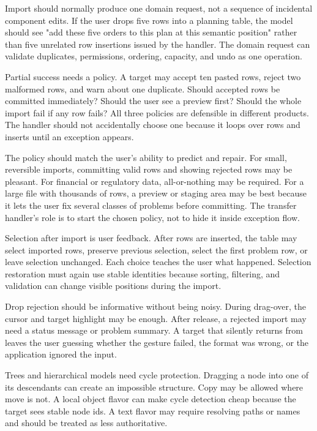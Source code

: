 Import should normally produce one domain request, not a sequence of incidental component edits. If the user drops five rows into a planning table, the model should see "add these five orders to this plan at this semantic position" rather than five unrelated row insertions issued by the handler. The domain request can validate duplicates, permissions, ordering, capacity, and undo as one operation.

Partial success needs a policy. A target may accept ten pasted rows, reject two malformed rows, and warn about one duplicate. Should accepted rows be committed immediately? Should the user see a preview first? Should the whole import fail if any row fails? All three policies are defensible in different products. The handler should not accidentally choose one because it loops over rows and inserts until an exception appears.

The policy should match the user's ability to predict and repair. For small, reversible imports, committing valid rows and showing rejected rows may be pleasant. For financial or regulatory data, all-or-nothing may be required. For a large file with thousands of rows, a preview or staging area may be best because it lets the user fix several classes of problems before committing. The transfer handler's role is to start the chosen policy, not to hide it inside exception flow.

Selection after import is user feedback. After rows are inserted, the table may select imported rows, preserve previous selection, select the first problem row, or leave selection unchanged. Each choice teaches the user what happened. Selection restoration must again use stable identities because sorting, filtering, and validation can change visible positions during the import.

Drop rejection should be informative without being noisy. During drag-over, the cursor and target highlight may be enough. After release, a rejected import may need a status message or problem summary. A target that silently returns  from  leaves the user guessing whether the gesture failed, the format was wrong, or the application ignored the input.

Trees and hierarchical models need cycle protection. Dragging a node into one of its descendants can create an impossible structure. Copy may be allowed where move is not. A local object flavor can make cycle detection cheap because the target sees stable node ids. A text flavor may require resolving paths or names and should be treated as less authoritative.

